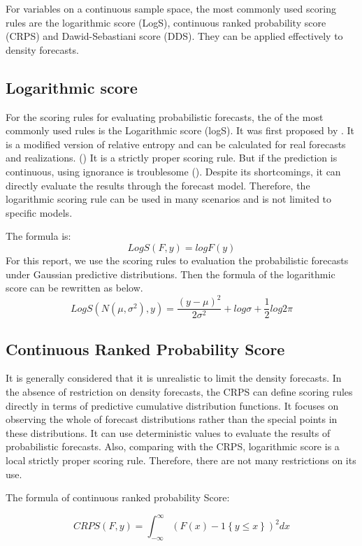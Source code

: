 \documentclass{monashthesis}
\theoremstyle{definition}
\theoremstyle{definition}
\theoremstyle{definition}
\theoremstyle{remark}
\begin{document}
For variables on a continuous sample space, the most commonly used
scoring rules are the logarithmic score (LogS), continuous ranked
probability score (CRPS) and Dawid-Sebastiani score (DDS). They can be
applied effectively to density forecasts.

\subsection{Logarithmic score}\label{logarithmic-score}

For the scoring rules for evaluating probabilistic forecasts, the of the
most commonly used rules is the Logarithmic score (logS). It was first
proposed by \textcite{G52}. It is a modified version of relative entropy
and can be calculated for real forecasts and realizations.
(\textcite{RS02}) It is a strictly proper scoring rule. But if the
prediction is continuous, using ignorance is troublesome
(\textcite{P10}). Despite its shortcomings, it can directly evaluate the
results through the forecast model. Therefore, the logarithmic scoring
rule can be used in many scenarios and is not limited to specific
models.

The formula is: \[
      LogS(F,y)=logF(y)
  \] For this report, we use the scoring rules to evaluation the
probabilistic forecasts under Gaussian predictive distributions. Then
the formula of the logarithmic score can be rewritten as below. \[
      LogS(N(\mu,\sigma^2),y)=\frac{(y-\mu)^2}{2\sigma^2}+log\sigma+\frac{1}{2}log2\pi
  \]

\subsection{Continuous Ranked Probability
Score}\label{continuous-ranked-probability-score}

It is generally considered that it is unrealistic to limit the density
forecasts. In the absence of restriction on density forecasts, the CRPS
can define scoring rules directly in terms of predictive cumulative
distribution functions. It focuses on observing the whole of forecast
distributions rather than the special points in these distributions. It
can use deterministic values to evaluate the results of probabilistic
forecasts. Also, comparing with the CRPS, logarithmic score is a local
strictly proper scoring rule. Therefore, there are not many restrictions
on its use.

The formula of continuous ranked probability Score:

\[
       CRPS(F,y)=\int_{-\infty}^{\infty}(F(x)-1\left\{y\leq{x}\right\})^2 dx
   \]
\end{document}
